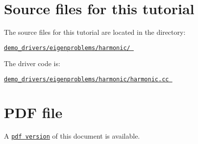  

\hypertarget{index_sources}{}\section{Source files for this tutorial}\label{index_sources}

\begin{DoxyItemize}
\item The source files for this tutorial are located in the directory\+: \begin{center} \href{../../../../demo_drivers/eigenproblems/harmonic/}{\tt demo\+\_\+drivers/eigenproblems/harmonic/ } \end{center} 
\item The driver code is\+: \begin{center} \href{../../../../demo_drivers/eigenproblems/harmonic/harmonic.cc}{\tt demo\+\_\+drivers/eigenproblems/harmonic/harmonic.\+cc } \end{center} 
\end{DoxyItemize}



 

 \hypertarget{index_pdf}{}\section{P\+D\+F file}\label{index_pdf}
A \href{../latex/refman.pdf}{\tt pdf version} of this document is available. 
